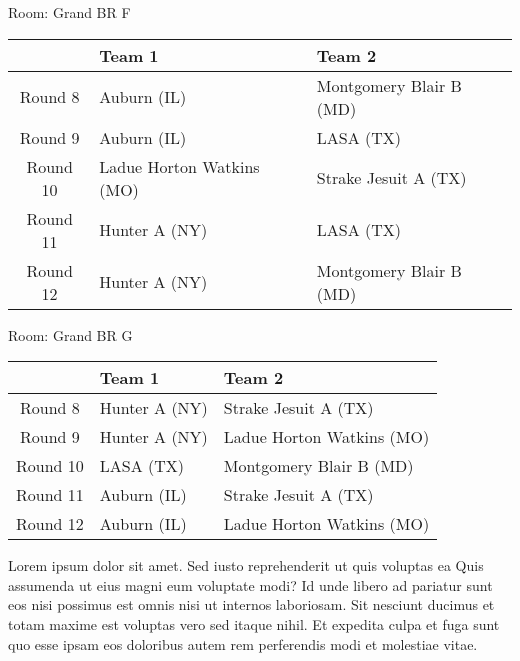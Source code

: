 \documentclass{article}%
\begin{document}
\vspace*{8pt}%
\linebreak%
\begin{flushleft}%
\begin{Large}%
Room: Grand BR F%
\end{Large}%
\end{flushleft}%
\begin{tabularx}{\textwidth}{|c|Y|Y|}%
\hline%
&Team 1&Team 2\\%
\hline%
Round 8&Auburn (IL)&Montgomery Blair B (MD)\\%
Round 9&Auburn (IL)&LASA (TX)\\%
Round 10&Ladue Horton Watkins (MO)&Strake Jesuit A (TX)\\%
Round 11&Hunter A (NY)&LASA (TX)\\%
Round 12&Hunter A (NY)&Montgomery Blair B (MD)\\%
\hline%
\end{tabularx}%
\vspace*{8pt}%
\linebreak%
\begin{flushleft}%
\begin{Large}%
Room: Grand BR G%
\end{Large}%
\end{flushleft}%
\begin{tabularx}{\textwidth}{|c|Y|Y|}%
\hline%
&Team 1&Team 2\\%
\hline%
Round 8&Hunter A (NY)&Strake Jesuit A (TX)\\%
Round 9&Hunter A (NY)&Ladue Horton Watkins (MO)\\%
Round 10&LASA (TX)&Montgomery Blair B (MD)\\%
Round 11&Auburn (IL)&Strake Jesuit A (TX)\\%
Round 12&Auburn (IL)&Ladue Horton Watkins (MO)\\%
\hline%
\end{tabularx}%
\vspace*{8pt}%
\linebreak%
\newline%
Lorem ipsum dolor sit amet. Sed iusto reprehenderit ut quis voluptas ea Quis assumenda ut eius magni eum voluptate modi? Id unde libero ad pariatur sunt eos nisi possimus est omnis nisi ut internos laboriosam. Sit nesciunt ducimus et totam maxime est voluptas vero sed itaque nihil. Et expedita culpa et fuga sunt quo esse ipsam eos doloribus autem rem perferendis modi et molestiae vitae.\newline%
\end{document}

